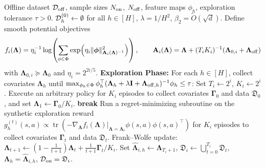\begin{algorithm}[htbp]
    \caption{Unabridged Online-to-Offline Hybrid RL (Algorithm~\ref{alg:ch02-alg2})}
    \label{alg:ch02-rappel-full}
    \begin{algorithmic}[1]
         Offline dataset ${\mathcal{D}}_{{\operatorname{off}}}$, sample sizes $N_{{\operatorname{on}}}$, $N_{{\operatorname{off}}}$, feature maps $\phi_h$, exploration tolerance $\tau > 0$.
         ${\mathcal{D}}_h^{(0)}\leftarrow \emptyset$ for all $h \in [H]$, $\lambda = 1/H^2$, $\beta_2 = \tilde{O}(\sqrt{d})$. Define smooth potential objectives
        \begin{equation*}
            f_i(\boldsymbol{\Lambda})=\eta_i^{-1} \log\!\left(\sum_{\phi \in \Phi} \exp\!\left({\eta_i\|\boldsymbol{\phi}\|_{\mathbf{A}_i(\boldsymbol{\Lambda})^{-1}}^2}\right)\right), \qquad \mathbf{A}_i(\boldsymbol{\Lambda})=\boldsymbol{\Lambda}+(T_i K_i)^{-1}( \boldsymbol{\Lambda}_{0, i}+ \boldsymbol{\Lambda}_{{\operatorname{off}}})
        \end{equation*}
        with $\boldsymbol{\Lambda}_{0, i} \succeq \boldsymbol{\Lambda}_0$ and $\eta_i=2^{2 i / 5}$.
        \State \textbf{Exploration Phase:} For each $h \in [H]$, collect covariates $\boldsymbol{\Lambda}_{h}$ until $\max_{\phi_h \in \Phi} \phi_h^{\top}(\boldsymbol{\Lambda}_{h} + \lambda \mathbf{I} + \boldsymbol{\Lambda}_{{\operatorname{off}},h})^{-1}\phi_h \leq \tau$:
            \State Set $T_i \leftarrow 2^i$, $K_i \leftarrow 2^i$.
            \State Execute an arbitrary policy for $K_i$ episodes to collect covariates $\boldsymbol{\Gamma}_0$ and data $\mathfrak{D}_0$, and set $\boldsymbol{\Lambda}_1 \gets \boldsymbol{\Gamma}_0/K_i$.
                 \textbf{break} \EndIf
                \State Run a regret-minimizing subroutine \citep{wagenmaker2022firstorder} on the synthetic exploration reward $g_h^{(t)}(s,a) \propto \operatorname{tr}(-\nabla_{\boldsymbol{\Lambda}} f_i(\boldsymbol{\Lambda})|_{\boldsymbol{\Lambda}=\boldsymbol{\Lambda}_t} \phi(s,a)\phi(s,a)^{\top})$ for $K_i$ episodes to collect covariates $\boldsymbol{\Gamma}_t$ and data $\mathfrak{D}_t$.
                \State Frank--Wolfe update: $\boldsymbol{\Lambda}_{t+1} \gets (1-\frac{1}{t+1})\boldsymbol{\Lambda}_{t} + \frac{1}{t+1}\boldsymbol{\Gamma}_{t}/{K_i}$.
            \EndFor
            \State Set $\widehat{\boldsymbol{\Lambda}}_{i,h} \gets \boldsymbol{\Lambda}_{T_i+1}$, $\mathfrak{D}_i \gets \bigcup_{t=0}^{T_i}\mathfrak{D}_t$, $\boldsymbol{\Lambda}_h = \widehat{\boldsymbol{\Lambda}}_{i,h}$, ${\mathcal{D}}_{{\operatorname{on}}} = \mathfrak{D}_i$.

\end{algorithmic}
\end{algorithm}

